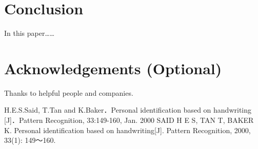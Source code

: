 ﻿\documentclass[UTF8]{csoarticle}
\begin{document}
\section{Conclusion}

In this paper……

\section*{Acknowledgements (Optional)}

Thanks to helpful people and companies.



\begin{thebibliography}{2} %
     H.E.S.Said, T.Tan and K.Baker．Personal identification based on handwriting [J]．Pattern Recognition, 33:149-160, Jan. 2000
     SAID H E S, TAN T, BAKER K. Personal identification based on handwriting[J]. Pattern Recognition, 2000, 33(1): 149～160.
\end{thebibliography}
\end{document}
